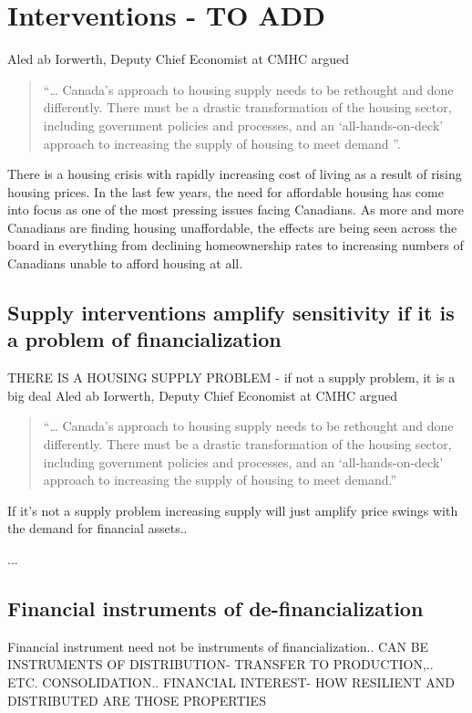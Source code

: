 \chapter{Interventions - TO ADD} \label{chapter-interventions}

Aled ab Iorwerth, Deputy Chief Economist at CMHC argued
\begin{quotation}
     “… Canada’s approach to housing supply needs to be rethought and done differently. There must be a drastic transformation of the housing sector, including government policies and processes, and an ‘all-hands-on-deck’ approach to increasing the supply of housing to meet demand ”\cite{CanadaHousingSupply2022}.
\end{quotation}

There is a housing crisis with rapidly increasing cost of living as a result of rising housing prices. 
In the last few years, the need for affordable housing has come into focus as one of the most pressing issues facing Canadians. As more and more Canadians are finding housing unaffordable, the effects are being seen across the board in everything from declining homeownership rates to increasing numbers of Canadians unable to afford housing at all.





\section{Supply interventions amplify sensitivity if it is a problem of financialization}

THERE IS A HOUSING SUPPLY PROBLEM  - if not a supply problem, it is a big deal
Aled ab Iorwerth, Deputy Chief Economist at CMHC argued
\begin{quotation}
     “… Canada’s approach to housing supply needs to be rethought and done differently. There must be a drastic transformation of the housing sector, including government policies and processes, and an ‘all-hands-on-deck’ approach to increasing the supply of housing to meet demand.”\cite{CanadaHousingSupply2022}
\end{quotation}

If it's not a supply problem increasing supply will just amplify price swings with the demand for financial assets..


...

\section{Financial instruments of de-financialization}
Financial instrument need not be instruments of financialization..
CAN BE INSTRUMENTS OF DISTRIBUTION- TRANSFER TO PRODUCTION,.. ETC. CONSOLIDATION.. FINANCIAL INTEREST- HOW RESILIENT AND DISTRIBUTED ARE THOSE PROPERTIES

